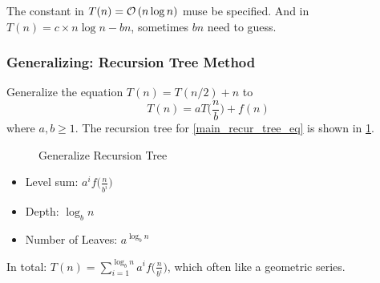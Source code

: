 \Note The constant in $T(n) = \mathcal{O}\left(n\log n\right)$ muse be specified.
And in $T(n) = c\times n\log n - bn$, sometimes $bn$ need to guess.

\subsubsection{Generalizing: Recursion Tree Method}
Generalize the equation $T(n) = T(n/2) + n$ to
\begin{equation}\label{main_recur_tree_eq}
    T(n) = a T\big(\frac{n}{b}\big) + f(n)
\end{equation}
where $a,b \geq 1$. The recursion tree for \cref{main_recur_tree_eq} is shown in \cref{main_recur_tree}.

\begin{figure}[H]
    \caption{Generalize Recursion Tree}\label{main_recur_tree}
\end{figure}

\observation

\begin{itemize}
    \item Level sum:  $\displaystyle a^i f\big(\frac{n}{b^i}\big)$
    \item Depth:      $\log_b n$
    \item Number of Leaves:    $a^{\log_b n}$
\end{itemize}

In total: $T(n) = \displaystyle \sum_{i=1}^{\log_b n} a^if\big(\frac{n}{b^i}\big)$, which often like a geometric series.


